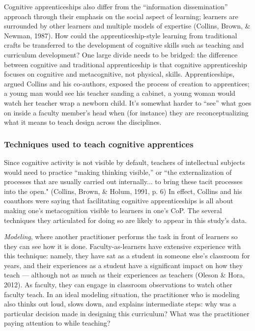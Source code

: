 Cognitive apprenticeships also differ from the “information dissemination” approach through their emphasis on the social aspect of learning; learners are surrounded by other learners and multiple models of expertise (Collins, Brown, & Newman, 1987). How could the apprenticeship-style learning from traditional crafts be transferred to the development of cognitive skills such as teaching and curriculum development? One large divide needs to be bridged: the difference between cognitive and traditional apprenticeship is that cognitive apprenticeship focuses on cognitive and metacognitive, not physical, skills. Apprenticeships, argued Collins and his co-authors, exposed the process of creation to apprentices; a young man would see his teacher sanding a cabinet, a young woman would watch her teacher wrap a newborn child. It’s somewhat harder to “see” what goes on inside a faculty member’s head when (for instance) they are reconceptualizing what it means to teach design across the disciplines.

\subsubsection{Techniques used to teach cognitive apprentices}

Since cognitive activity is not visible by default, teachers of intellectual subjects would need to practice “making thinking visible,” or “the externalization of processes that are usually carried out internally... to bring these tacit processes into the open." (Collins, Brown, & Holum, 1991, p. 6) In effect, Collins and his coauthors were saying that facilitating cognitive apprenticeships is all about making one’s metacognition visible to learners in one’s CoP. The several techniques they articulated for doing so are likely to appear in this study’s data.

\emph{Modeling}, where another practitioner performs the task in front of learners so they can see how it is done. Faculty-as-learners have extensive experience with this technique: namely, they have sat as a student in someone else’s classroom for years, and their experiences as a student have a significant impact on how they teach — although not as much as their experiences as teachers (Oleson & Hora, 2012). As faculty, they can engage in classroom observations to watch other faculty teach. In an ideal modeling situation, the practitioner who is modeling also thinks out loud, slows down, and explains intermediate steps: why was a particular decision made in designing this curriculum? What was the practitioner paying attention to while teaching?

